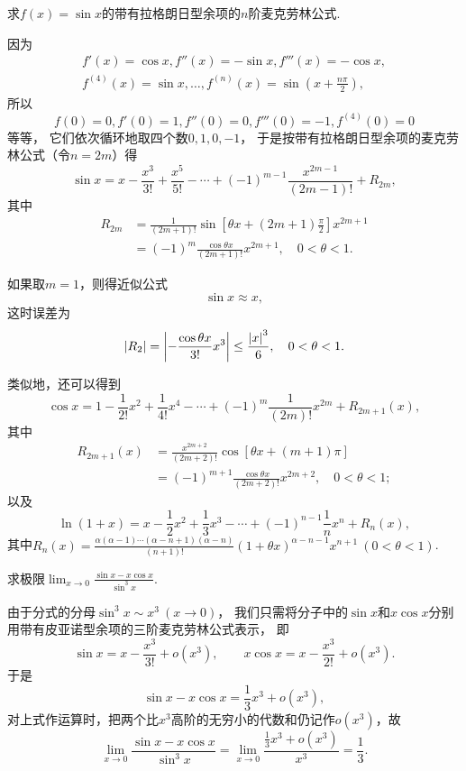 \begin{example}
求\(f(x)=\sin x\)的带有拉格朗日型余项的\(n\)阶麦克劳林公式.
\begin{solution}
因为\[
	\begin{split}
		f'(x)=\cos x,
		f''(x)=-\sin x,
		f'''(x)=-\cos x, \\
		f^{(4)}(x)=\sin x,
		\dotsc,
		f^{(n)}(x)=\sin\left(x+\frac{n\pi}{2}\right),
	\end{split}
\]
所以\[
	f(0)=0,f'(0)=1,f''(0)=0,f'''(0)=-1,f^{(4)}(0)=0
\]等等，
它们依次循环地取四个数\(0,1,0,-1\)，
于是按带有拉格朗日型余项的麦克劳林公式（令\(n=2m\)）得\[
	\sin x = x - \frac{x^3}{3!} + \frac{x^5}{5!} - \dotsb + (-1)^{m-1} \frac{x^{2m-1}}{(2m-1)!} + R_{2m},
\]
其中\[
	\begin{split}
		R_{2m}
		&= \frac{1}{(2m+1)!} \sin\left[\theta x + (2m+1)\frac{\pi}{2}\right] x^{2m+1} \\
		&= (-1)^m \frac{\cos \theta x}{(2m+1)!} x^{2m+1},
		\quad 0<\theta<1.
	\end{split}
\]

如果取\(m=1\)，则得近似公式\[
	\sin x \approx x,
\]
这时误差为\[
	\abs{R_2} = \abs{-\frac{\cos \theta x}{3!} x^3}
	\leq \frac{\abs{x}^3}{6},
	\quad 0<\theta<1.
\]
\end{solution}
\end{example}

类似地，还可以得到\[
	\cos x
	= 1 - \frac{1}{2!} x^2
		+ \frac{1}{4!} x^4 - \dotsb
		+ (-1)^m \frac{1}{(2m)!} x^{2m}
		+ R_{2m+1}(x),
\]
其中\[
	\begin{split}
		R_{2m+1}(x)
		&= \frac{x^{2m+2}}{(2m+2)!} \cos\left[\theta x + (m+1)\pi\right] \\
		&= (-1)^{m+1} \frac{\cos \theta x}{(2m+2)!} x^{2m+2},
		\quad 0<\theta<1;
	\end{split}
\]
以及\[
	\ln(1+x)
	= x - \frac{1}{2} x^2 + \frac{1}{3} x^3 - \dotsb
		+ (-1)^{n-1} \frac{1}{n} x^n + R_n(x),
\]
其中\(R_n(x) = \frac{\alpha(\alpha-1)\dotsm(\alpha-n+1)(\alpha-n)}{(n+1)!}
(1+\theta x)^{\alpha-n-1} x^{n+1}\ (0<\theta<1)\).

\begin{example}
求极限\(\lim_{x\to0}\frac{\sin x - x \cos x}{\sin^3 x}\).
\begin{solution}
由于分式的分母\(\sin^3 x \sim x^3\ (x\to0)\)，
我们只需将分子中的\(\sin x\)和\(x \cos x\)分别用带有皮亚诺型余项的三阶麦克劳林公式表示，
即\[
	\sin x = x - \frac{x^3}{3!} + o(x^3),
	\qquad
	x \cos x = x - \frac{x^3}{2!} + o(x^3).
\]
于是\[
	\sin x - x \cos x = \frac{1}{3} x^3 + o(x^3),
\]
对上式作运算时，把两个比\(x^3\)高阶的无穷小的代数和仍记作\(o(x^3)\)，故\[
	\lim_{x\to0}\frac{\sin x - x \cos x}{\sin^3 x}
	= \lim_{x\to0}\frac{\frac{1}{3} x^3 + o(x^3)}{x^3} = \frac{1}{3}.
\]
\end{solution}
\end{example}

